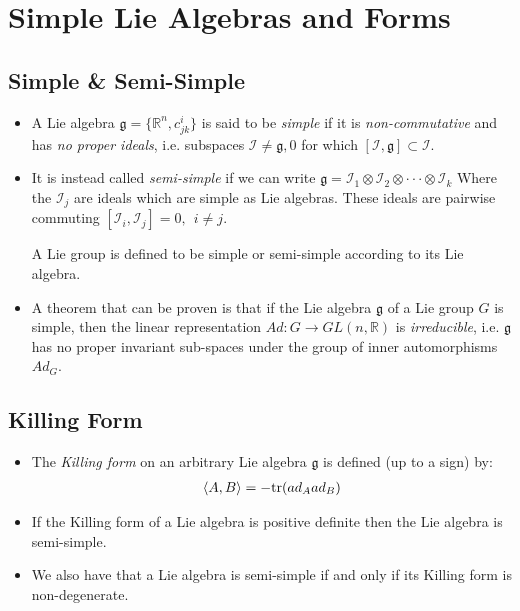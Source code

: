 \documentclass[11pt]{article}
\numberwithin{equation}{section}
\DeclareRobustCommand{\RR}{\mathbb{R}}
\begin{document}
\newpage 
\section{Simple Lie Algebras and Forms}

\subsection{Simple \& Semi-Simple}
\begin{itemize}
  \item A Lie algebra $\mathfrak{g} = \{\RR^n,c^{i}_{jk}\}$ is said to be \emph{simple} if it is \emph{non-commutative} and has \emph{no proper ideals}, i.e. subspaces $\mathcal{I} \neq \mathfrak{g},0$ for which $[\mathcal{I},\mathfrak{g}] \subset \mathcal{I}$.  


  \item It is instead called \emph{semi-simple} if we can write $\mathfrak{g} = \mathcal{I}_1 \otimes \mathcal{I}_2 \otimes \cdot \cdot \cdot \otimes \mathcal{I}_k$ Where the $\mathcal{I}_j$ are ideals which are simple as Lie algebras. These ideals are pairwise commuting $[\mathcal{I}_i,\mathcal{I}_j] = 0,~~i\neq j$. 

  A Lie group is defined to be simple or semi-simple according to its Lie algebra. 

  \item A theorem that can be proven is that if the Lie algebra $\mathfrak{g}$ of a Lie group $G$ is simple, then the linear representation $Ad:G\rightarrow GL(n,\RR)$ is \emph{irreducible}, i.e. $\mathfrak{g}$ has no proper invariant sub-spaces under the group of inner automorphisms $Ad_{G}$.  
\end{itemize}

\subsection{Killing Form}
\begin{itemize}
  \item The \emph{Killing form} on an arbitrary Lie algebra $\mathfrak{g}$ is defined (up to a sign) by:
  \begin{align*}
     \braket{A,B} = -\text{tr}(ad_{A}ad_{B})
   \end{align*} 
   \item If the Killing form of a Lie algebra is positive definite then the Lie algebra is semi-simple. 

   \item We also have that a Lie algebra is semi-simple if and only if its Killing form is non-degenerate. 
\end{itemize}
\end{document}
